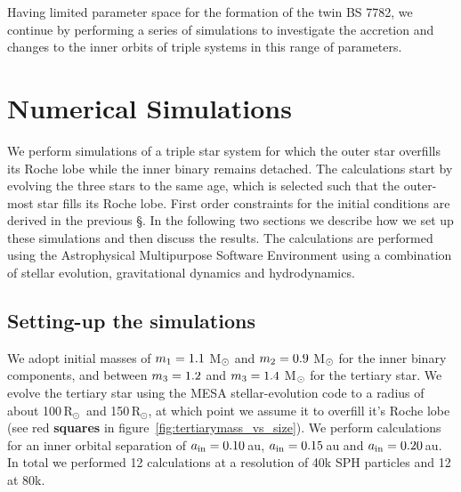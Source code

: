 \documentclass[twocolumn]{aastex62}
\newcommand{\RSun}{\mbox{R$_\odot$}}
\begin{document}
Having limited parameter space for the formation of the twin BS 7782, we continue by performing a series of simulations to
investigate the accretion and changes to the inner orbits of triple
systems in this range of parameters.

\section{Numerical Simulations} \label{sims}

We perform simulations of a triple star system for which the outer
star overfills its Roche lobe while the inner binary remains
detached. The calculations start by evolving the three stars to the
same age, which is selected such that the outer-most star fills its
Roche lobe.  First order constraints for the initial conditions are
derived in the previous \S. In the following two sections we describe
how we set up these simulations and then discuss the results. The
calculations are performed using the Astrophysical Multipurpose
Software Environment using a combination of stellar evolution,
gravitational dynamics and hydrodynamics.

\subsection{Setting-up the simulations}

We adopt initial masses of $m_{\rm 1} = 1.1$ M$_{\rm \odot}$ and
$m_{\rm 2} = 0.9$ M$_{\rm \odot}$ for the inner binary components, and
between $m_{\rm 3} = 1.2$ and $m_{\rm 3} = 1.4$ M$_{\rm \odot}$ for
the tertiary star.  We evolve the tertiary star using the MESA
stellar-evolution code \cite{2011ApJS..192....3P} to a radius of about
100\,\RSun\, and 150\,\RSun, at which point we assume it to overfill
it's Roche lobe (see red \textbf{squares} in
figure~\ref{fig:tertiarymass_vs_size}).  We perform calculations for an
inner orbital separation of $a_{\rm in} = 0.10$\,au, $a_{\rm in} =
0.15$\,au and $a_{\rm in} = 0.20$\,au.  In total we performed 12
calculations at a resolution of 40k SPH particles and 12 at 80k.
\end{document}
